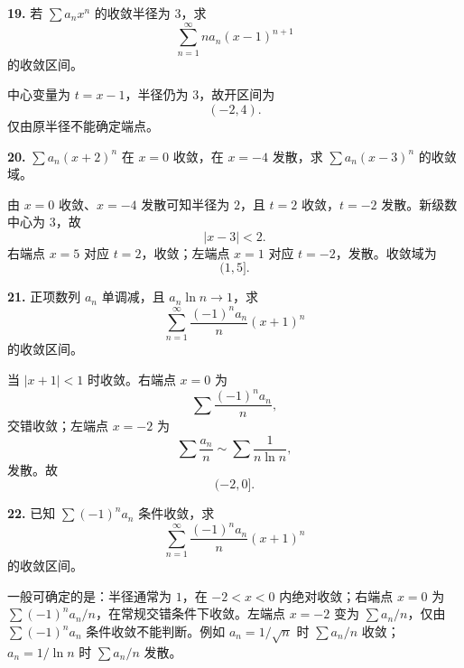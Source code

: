 \begin{problemblock}
\textbf{19.} 若 \(\sum a_nx^n\) 的收敛半径为 \(3\)，求
\[
\sum_{n=1}^{\infty}n a_n(x-1)^{n+1}
\]
的收敛区间。
\end{problemblock}
\begin{solutionblock}
中心变量为 \(t=x-1\)，半径仍为 \(3\)，故开区间为
\[
\boxed{(-2,4)}.
\]
仅由原半径不能确定端点。
\end{solutionblock}

\begin{problemblock}
\textbf{20.} \(\sum a_n(x+2)^n\) 在 \(x=0\) 收敛，在 \(x=-4\) 发散，求 \(\sum a_n(x-3)^n\) 的收敛域。
\end{problemblock}
\begin{solutionblock}
由 \(x=0\) 收敛、\(x=-4\) 发散可知半径为 \(2\)，且 \(t=2\) 收敛，\(t=-2\) 发散。新级数中心为 \(3\)，故
\[
|x-3|<2.
\]
右端点 \(x=5\) 对应 \(t=2\)，收敛；左端点 \(x=1\) 对应 \(t=-2\)，发散。收敛域为
\[
\boxed{(1,5]}.
\]
\end{solutionblock}

\begin{problemblock}
\textbf{21.} 正项数列 \(a_n\) 单调减，且 \(a_n\ln n\to1\)，求
\[
\sum_{n=1}^{\infty}\frac{(-1)^na_n}{n}(x+1)^n
\]
的收敛区间。
\end{problemblock}
\begin{solutionblock}
当 \(|x+1|<1\) 时收敛。右端点 \(x=0\) 为
\[
\sum\frac{(-1)^na_n}{n},
\]
交错收敛；左端点 \(x=-2\) 为
\[
\sum\frac{a_n}{n}\sim\sum\frac1{n\ln n},
\]
发散。故
\[
\boxed{(-2,0]}.
\]
\end{solutionblock}

\begin{problemblock}
\textbf{22.} 已知 \(\sum(-1)^na_n\) 条件收敛，求
\[
\sum_{n=1}^{\infty}\frac{(-1)^na_n}{n}(x+1)^n
\]
的收敛区间。
\end{problemblock}
\begin{solutionblock}
一般可确定的是：半径通常为 \(1\)，在 \(-2<x<0\) 内绝对收敛；右端点 \(x=0\) 为 \(\sum(-1)^na_n/n\)，在常规交错条件下收敛。左端点 \(x=-2\) 变为 \(\sum a_n/n\)，仅由 \(\sum(-1)^na_n\) 条件收敛不能判断。例如 \(a_n=1/\sqrt n\) 时 \(\sum a_n/n\) 收敛；\(a_n=1/\ln n\) 时 \(\sum a_n/n\) 发散。
\answer{可确定部分为 \((-2,0]\)，但 \(x=-2\) 端点题面条件不足。}
\end{solutionblock}

